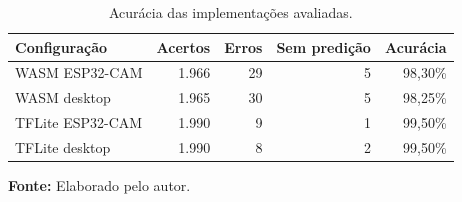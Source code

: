 \begin{table}[H]
\centering
\caption{Acurácia das implementações avaliadas.}
\label{tab:acuracia-configuracoes}

\small
\begin{tabular}{lrrrr}
\toprule
\textbf{Configuração} &
\textbf{Acertos} &
\textbf{Erros} &
\textbf{Sem predição} &
\textbf{Acurácia} \\
\midrule

WASM ESP32-CAM &
1.966 & 29 & 5 & 98,30\% \\

WASM desktop &
1.965 & 30 & 5 & 98,25\% \\

TFLite ESP32-CAM &
1.990 & 9 & 1 & 99,50\% \\

TFLite desktop &
1.990 & 8 & 2 & 99,50\% \\

\bottomrule
\end{tabular}

\vspace{0.3cm}
\small \textbf{Fonte:} Elaborado pelo autor.
\end{table}
